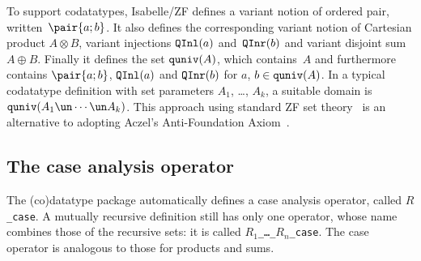 To support codatatypes, Isabelle/ZF defines a variant notion of ordered
pair, written~$\pair{a;b}$.  It also defines the corresponding variant
notion of Cartesian product $A\otimes B$, variant injections $\hbox{\tt QInl}(a)$
and~$\hbox{\tt QInr}(b)$ and variant disjoint sum $A\oplus B$.  Finally it defines
the set $\hbox{\tt quniv}(A)$, which contains~$A$ and furthermore contains
$\pair{a;b}$, $\hbox{\tt QInl}(a)$ and $\hbox{\tt QInr}(b)$ for $a$, $b\in\hbox{\tt quniv}(A)$.  In a
typical codatatype definition with set parameters $A_1$, \ldots, $A_k$, a
suitable domain is $\quniv(A_1\un\cdots\un A_k)$.  This approach using
standard ZF set theory~\cite{paulson-final} is an alternative to adopting
Aczel's Anti-Foundation Axiom~\cite{aczel88}.

\subsection{The case analysis operator}
The (co)datatype package automatically defines a case analysis operator,
called {\tt$R$\_case}.  A mutually recursive definition still has only one
operator, whose name combines those of the recursive sets: it is called
{\tt$R_1$\_\ldots\_$R_n$\_case}.  The case operator is analogous to those
for products and sums.

